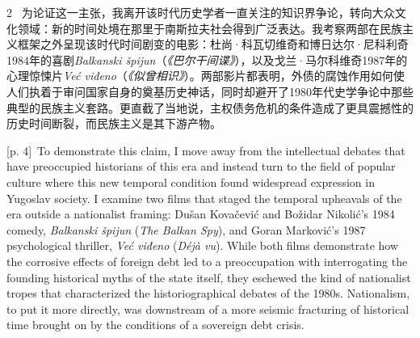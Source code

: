 \documentclass[10pt,a4paper]{article}
\begin{document}
\begin{paracol}{2}
\switchcolumn*
{\scriptsize\color{gray} [p. 4]}\ 为论证这一主张，我离开该时代历史学者一直关注的知识界争论，转向大众文化领域：新的时间处境在那里于南斯拉夫社会得到广泛表达。我考察两部在民族主义框架之外呈现该时代时间剧变的电影：杜尚·科瓦切维奇和博日达尔·尼科利奇1984年的喜剧\textit{Balkanski špijun}（\textit{《巴尔干间谍》}），以及戈兰·马尔科维奇1987年的心理惊悚片\textit{Već viđeno}（\textit{《似曾相识》}）。两部影片都表明，外债的腐蚀作用如何使人们执着于审问国家自身的奠基历史神话，同时却避开了1980年代史学争论中那些典型的民族主义套路。更直截了当地说，主权债务危机的条件造成了更具震撼性的历史时间断裂，而民族主义是其下游产物。\par
\switchcolumn
{\scriptsize\color{gray} [p. 4]}\ To demonstrate this claim, I move away from the intellectual debates that have preoccupied historians of this era and instead turn to the field of popular culture where this new temporal condition found widespread expression in Yugoslav society. I examine two films that staged the temporal upheavals of the era outside a nationalist framing: Dušan Kovačević and Božidar Nikolić’s 1984 comedy, \textit{Balkanski špijun} (\textit{The Balkan Spy}), and Goran Marković’s 1987 psychological thriller, \textit{Već viđeno} (\textit{Déjà vu}). While both films demonstrate how the corrosive effects of foreign debt led to a preoccupation with interrogating the founding historical myths of the state itself, they eschewed the kind of nationalist tropes that characterized the historiographical debates of the 1980s. Nationalism, to put it more directly, was downstream of a more seismic fracturing of historical time brought on by the conditions of a sovereign debt crisis.\par
\switchcolumn*

\end{paracol}
\end{document}
